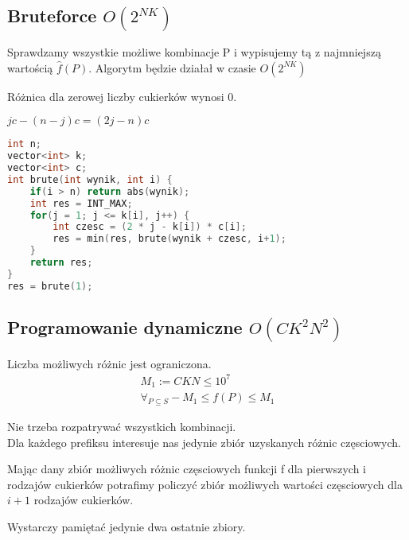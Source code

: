 \documentclass[paper=a4, fontsize=11pt]{article}
\begin{document}
\subsection{Bruteforce $O(2^{NK})$}
Sprawdzamy wszystkie możliwe kombinacje P i wypisujemy tą z najmniejszą wartością $\hat{f}(P)$. Algorytm będzie działał w czasie $O(2^{NK})$
\begin{observation} Różnica dla zerowej liczby cukierków wynosi 0.
\begin{observation} $jc - (n - j)c  = (2j - n)c$

\end{observation}

\begin{lstlisting}[language=c++]
int n;
vector<int> k;
vector<int> c;
int brute(int wynik, int i) {
	if(i > n) return abs(wynik);
	int res = INT_MAX;	
	for(j = 1; j <= k[i], j++) {
		int czesc = (2 * j - k[i]) * c[i];
		res = min(res, brute(wynik + czesc, i+1);
	}
	return res;
}
res = brute(1);

\end{lstlisting}

\subsection{Programowanie dynamiczne $O(CK^2N^2)$}
\begin{observation} Liczba możliwych różnic jest ograniczona.
\begin{gather*}
	M_1 := CKN \leq 10^7 \\
	\forall_{P\subseteq S} -M_1 \leq f(P) \leq M_1
\end{gather*}
\end{observation}
\begin{observation} Nie trzeba rozpatrywać wszystkich kombinacji. \\
Dla każdego prefiksu interesuje nas jedynie zbiór uzyskanych różnic częsciowych.
\end{observation}

\end{observation}
\begin{observation} Mając dany zbiór możliwych różnic częsciowych funkcji f dla pierwszych i rodzajów cukierków potrafimy policzyć zbiór możliwych wartości częsciowych dla $i+1$ rodzajów cukierków.
\end{observation}
\begin{observation} Wystarczy pamiętać jedynie dwa ostatnie zbiory.
\end{observation}
\end{document}
